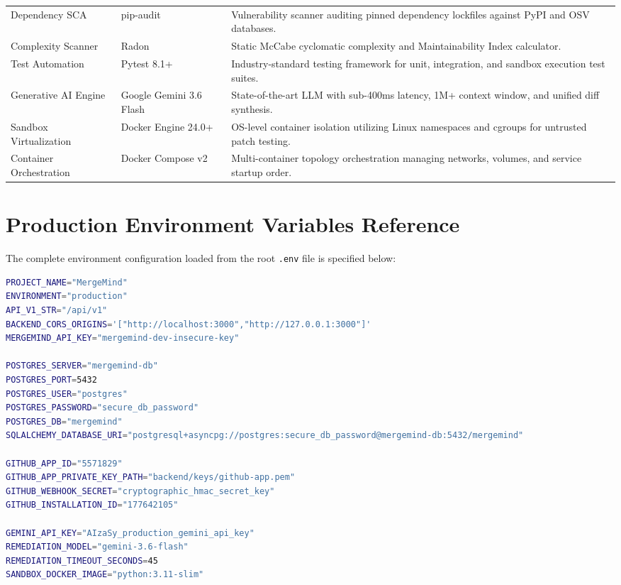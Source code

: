 \documentclass[12pt,a4paper,oneside]{report}
\begin{document}
\begin{longtable}{p{} p{} p{}}
\addlinespace
Dependency SCA & pip-audit & Vulnerability scanner auditing pinned dependency lockfiles against PyPI and OSV databases. \\
\addlinespace
Complexity Scanner & Radon & Static McCabe cyclomatic complexity and Maintainability Index calculator. \\
\addlinespace
Test Automation & Pytest 8.1+ & Industry-standard testing framework for unit, integration, and sandbox execution test suites. \\
\addlinespace
Generative AI Engine & Google Gemini 3.6 Flash & State-of-the-art LLM with sub-400ms latency, 1M+ context window, and unified diff synthesis. \\
\addlinespace
Sandbox Virtualization & Docker Engine 24.0+ & OS-level container isolation utilizing Linux namespaces and cgroups for untrusted patch testing. \\
\addlinespace
Container Orchestration & Docker Compose v2 & Multi-container topology orchestration managing networks, volumes, and service startup order. \\
\end{longtable}

\section{Production Environment Variables Reference}

The complete environment configuration loaded from the root \texttt{.env} file is specified below:

\begin{lstlisting}[language=bash, caption={Complete Production Environment Variable Configuration}]
PROJECT_NAME="MergeMind"
ENVIRONMENT="production"
API_V1_STR="/api/v1"
BACKEND_CORS_ORIGINS='["http://localhost:3000","http://127.0.0.1:3000"]'
MERGEMIND_API_KEY="mergemind-dev-insecure-key"

POSTGRES_SERVER="mergemind-db"
POSTGRES_PORT=5432
POSTGRES_USER="postgres"
POSTGRES_PASSWORD="secure_db_password"
POSTGRES_DB="mergemind"
SQLALCHEMY_DATABASE_URI="postgresql+asyncpg://postgres:secure_db_password@mergemind-db:5432/mergemind"

GITHUB_APP_ID="5571829"
GITHUB_APP_PRIVATE_KEY_PATH="backend/keys/github-app.pem"
GITHUB_WEBHOOK_SECRET="cryptographic_hmac_secret_key"
GITHUB_INSTALLATION_ID="177642105"

GEMINI_API_KEY="AIzaSy_production_gemini_api_key"
REMEDIATION_MODEL="gemini-3.6-flash"
REMEDIATION_TIMEOUT_SECONDS=45
SANDBOX_DOCKER_IMAGE="python:3.11-slim"
\end{lstlisting}
\end{document}
